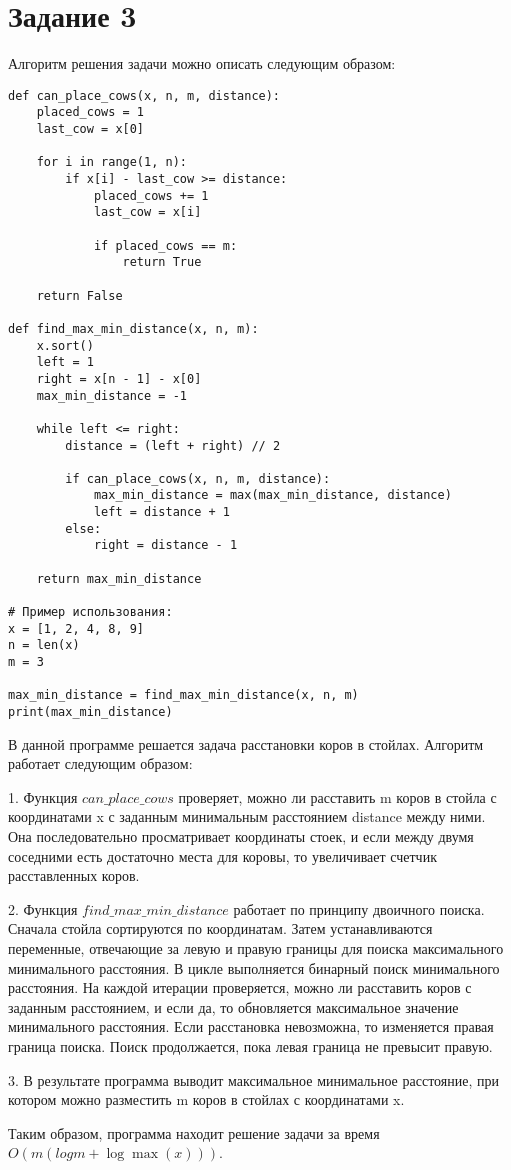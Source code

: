 
\section*{Задание 3}
Алгоритм решения задачи можно описать следующим образом:

\begin{verbatim}
def can_place_cows(x, n, m, distance):
    placed_cows = 1
    last_cow = x[0]
    
    for i in range(1, n):
        if x[i] - last_cow >= distance:
            placed_cows += 1
            last_cow = x[i]
            
            if placed_cows == m:
                return True
    
    return False

def find_max_min_distance(x, n, m):
    x.sort()
    left = 1
    right = x[n - 1] - x[0]
    max_min_distance = -1

    while left <= right:
        distance = (left + right) // 2
        
        if can_place_cows(x, n, m, distance):
            max_min_distance = max(max_min_distance, distance)
            left = distance + 1
        else:
            right = distance - 1
    
    return max_min_distance

# Пример использования:
x = [1, 2, 4, 8, 9]
n = len(x)
m = 3

max_min_distance = find_max_min_distance(x, n, m)
print(max_min_distance)
\end{verbatim}


В данной программе решается задача расстановки коров в стойлах. Алгоритм работает следующим образом:

1. Функция $can\_place\_cows$ проверяет, можно ли расставить m коров в стойла с координатами x с заданным минимальным расстоянием distance между ними. Она последовательно просматривает координаты стоек, и если между двумя соседними есть достаточно места для коровы, то увеличивает счетчик расставленных коров.

2. Функция $find\_max\_min\_distance$ работает по принципу двоичного поиска. Сначала стойла сортируются по координатам. Затем устанавливаются переменные, отвечающие за левую и правую границы для поиска максимального минимального расстояния. В цикле выполняется бинарный поиск минимального расстояния. На каждой итерации проверяется, можно ли расставить коров с заданным расстоянием, и если да, то обновляется максимальное значение минимального расстояния. Если расстановка невозможна, то изменяется правая граница поиска. Поиск продолжается, пока левая граница не превысит правую.

3. В результате программа выводит максимальное минимальное расстояние, при котором можно разместить m коров в стойлах с координатами x.

Таким образом, программа находит решение задачи за время $O(m(log m + \log \max(x)))$.